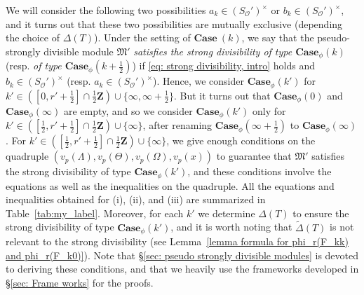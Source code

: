 \documentclass[11pt]{amsart}
\theoremstyle{definition}
\numberwithin{equation}{subsection}
\theoremstyle{plain}
\theoremstyle{plain}
\theoremstyle{plain}
\theoremstyle{plain}
\theoremstyle{plain}
\theoremstyle{plain}
\theoremstyle{plain}
\theoremstyle{plain}
\theoremstyle{plain}
\theoremstyle{plain}
\theoremstyle{plain}
\theoremstyle{plain}
\theoremstyle{definition}
\theoremstyle{definition}
\theoremstyle{definition}
\theoremstyle{remark}
\renewcommand{\(}{\textup{(}}
\renewcommand{\)}{\textup{)}}
\newcommand{\Z}{\mathbf{Z}}
\newcommand{\fM}{\mathfrak{M}}
\newcommand{\cO}{\mathcal{O}}
\begin{document}
We will consider the following two possibilities $a_k\in(S_\cO')^\times$ or $b_k\in(S_\cO')^\times$, and it turns out that these two possibilities are mutually exclusive (depending the choice of $\Delta(T)$). Under the setting of $\mathbf{Case}~(k)$, we say that the pseudo-strongly divisible module $\fM'$ \emph{satisfies the strong divisibility of type $\mathbf{Case}_\phi(k)$} (resp. \emph{of type $\mathbf{Case}_\phi(k+\tfrac{1}{2})$}) if \eqref{eq: strong divisibility, intro} holds and $b_k\in(S_\cO')^\times$ (resp. $a_k\in(S_\cO')^\times$). Hence, we consider $\mathbf{Case}_\phi(k')$ for $k'\in([0,r'+\tfrac{1}{2}]\cap\tfrac{1}{2}\Z)\cup\{\infty,\infty+\tfrac{1}{2}\}$. But it turns out that $\mathbf{Case}_\phi(0)$ and $\mathbf{Case}_\phi(\infty)$ are empty, and so we consider $\mathbf{Case}_\phi(k')$ only for $k'\in([\tfrac{1}{2},r'+\tfrac{1}{2}]\cap\tfrac{1}{2}\Z)\cup\{\infty\}$, after renaming $\mathbf{Case}_\phi(\infty+\tfrac{1}{2})$ to $\mathbf{Case}_\phi(\infty)$. For $k'\in([\tfrac{1}{2},r'+\tfrac{1}{2}]\cap\tfrac{1}{2}\Z)\cup\{\infty\}$, we give enough conditions on the quadruple $(v_p(\Lambda),v_p(\Theta),v_p(\Omega),v_p(x))$ to guarantee that $\fM'$ satisfies the strong divisibility of type $\mathbf{Case}_\phi(k')$, and these conditions involve the equations as well as the inequalities on the quadruple. All the equations and inequalities obtained for (i), (ii), and (iii) are summarized in Table~\ref{tab:my_label}. Moreover, for each $k'$ we determine $\Delta(T)$ to ensure the strong divisibility of type $\mathbf{Case}_\phi(k')$, and it is worth noting that $\tilde{\Delta}(T)$ is not relevant to the strong divisibility (see Lemma~\ref{lemma formula for phi_r(F_kk) and phi_r(F_k0)}). Note that \S\ref{sec: pseudo strongly divisible modules} is devoted to deriving these conditions, and that we heavily use the frameworks developed in \S\ref{sec: Frame works} for the proofs.
\end{document}
